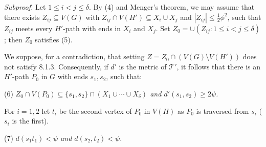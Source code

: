 \textit{Subproof.} Let $1 \le i < j \le \delta$. By (4) and Menger's theorem, we may assume that there exists $Z_{ij} \subseteq V(G)$ with $Z_{ij} \cap V(H') \subseteq X_i \cup X_j$ and $|Z_{ij}| \le \frac{1}{2}\phi^2$, such that $Z_{ij}$ meets every $H'$-path with ends in $X_i$ and $X_j$. Set $Z_0 = \cup(Z_{ij} \colon 1 \le i < j \le \delta)$; then $Z_0$ satisfies (5).

We suppose, for a contradiction, that setting $Z = Z_0 \cap (V(G) \setminus V(H'))$ does not satisfy 8.1.3. Consequently, if $d'$ is the metric of $\mathscr{T}'$, it follows that there is an $H'$-path $P_0$ in $G$ with ends $s_1, s_2$, such that:

\hspace*{12pt}(6) \textit{$Z_0 \cap V(P_0) \subseteq \{s_1, s_2\} \cap (X_1 \cup \cdots \cup X_\delta)$ and $d'(s_1, s_2) \ge 2\psi$.}

For $i = 1, 2$ let $t_i$ be the second vertex of $P_0$ in $V(H)$ as $P_0$ is traversed from $s_i$ ($s_i$ is the first).

\hspace*{12pt}(7) \textit{$d(s_1 t_1) < \psi$ and $d(s_2, t_2) < \psi$.}
